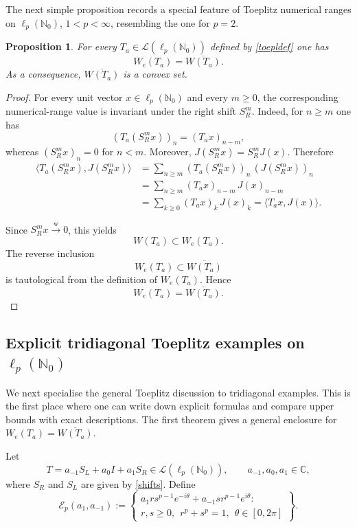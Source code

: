\documentclass[11pt]{amsart}
\numberwithin{equation}{section}
\newtheorem{proposition}[theorem]{Proposition}
\theoremstyle{definition}
\theoremstyle{remark}
\newcommand{\C}{\mathbb{C}}
\newcommand{\ip}[2]{\langle #1,#2\rangle}
\newcommand{\We}{W_e}
\newcommand{\wto}{\xrightarrow{\mathrm w}}
\begin{document}
The next simple proposition records a special feature of Toeplitz numerical
ranges on \(\ell_p(\mathbb N_0)\), \(1<p<\infty\), resembling the one for \(p=2\).
\begin{proposition}\label{prop:toeplitz-shift-lemma}
For every $T_a \in \mathcal L(\ell_p(\mathbb N_0))$ defined by \eqref{toepldef} one has
\[
\We(T_a)=\overline{W(T_a)}.
\]
As a consequence,
$\overline{W(T_a)}$ is a convex set.
\end{proposition}

\begin{proof}
For every unit vector \(x\in \ell_p(\mathbb N_0)\) and every \(m\ge0\),
the corresponding numerical-range value is invariant under the right shift
\(S_R^m\). Indeed, for \(n\ge m\) one has
\[
        (T_a(S_R^m x))_n=(T_ax)_{n-m},
\]
whereas \((S_R^m x)_n=0\) for \(n<m\). Moreover,
\(J(S_R^m x)=S_R^mJ(x)\). Therefore
\[
\begin{aligned}
\ip{T_a(S_R^m x)}{J(S_R^m x)}
&=\sum_{n\ge m} (T_a(S_R^m x))_n\, (J(S_R^m x))_n  \\
&=\sum_{n\ge m} (T_ax)_{n-m}\, J(x)_{n-m} \\
&=\sum_{k\ge0} (T_ax)_k\,J(x)_k
=\ip{T_ax}{J(x)}.
\end{aligned}
\]


Since $S_R^m x\wto 0$, this yields
\[
W(T_a)\subset \We(T_a).
\]
The reverse inclusion
\[
\We(T_a)\subset \overline{W(T_a)}
\]
is tautological from the definition of $\We(T_a)$. Hence
\[
\We(T_a)=\overline{W(T_a)}.
\]
\end{proof}

\subsection{Explicit tridiagonal Toeplitz examples on $\ell_p(\mathbb N_0)$}

We next specialise the general Toeplitz discussion to tridiagonal examples. This is the first place where one can write down explicit formulas and compare upper bounds with exact descriptions. The first theorem gives a general enclosure for $W_e(T_a)=\overline{W(T_a)}.$


Let
\begin{equation}\label{toeplitz}
T=a_{-1}S_L+a_0I+a_1S_R\in \mathcal L(\ell_p(\mathbb N_0)),
\qquad a_{-1},a_0,a_1\in\C,
\end{equation}
where $S_R$ and $S_L$ are given by \eqref{shifts}.
Define
\[
\mathcal E_p(a_1,a_{-1})
:=\left\{
\begin{array}{c}
a_1rs^{p-1}e^{-i\theta}+a_{-1}sr^{p-1}e^{i\theta}:\\[1mm]
r,s\ge0,\ \ r^p+s^p=1,\ \ \theta\in[0,2\pi]
\end{array}
\right\}.
\]
\end{document}
